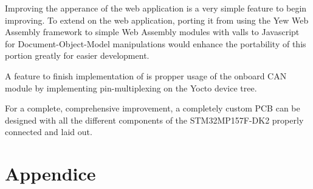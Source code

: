 \documentclass[12pt]{article}
\begin{document}
Improving the apperance of the web application is a very simple feature to begin
improving. To extend on the web application, porting it from using the Yew 
Web Assembly framework to simple Web Assembly modules with valls to Javascript 
for Document-Object-Model manipulations would enhance the portability of this portion
greatly for easier development.

A feature to finish implementation of is propper usage of the onboard CAN module 
by implementing pin-multiplexing on the Yocto device tree.

For a complete, comprehensive improvement, a completely custom PCB can be designed 
with all the different components of the STM32MP157F-DK2 properly connected
and laid out. 


\section{Appendice}
\end{document}
